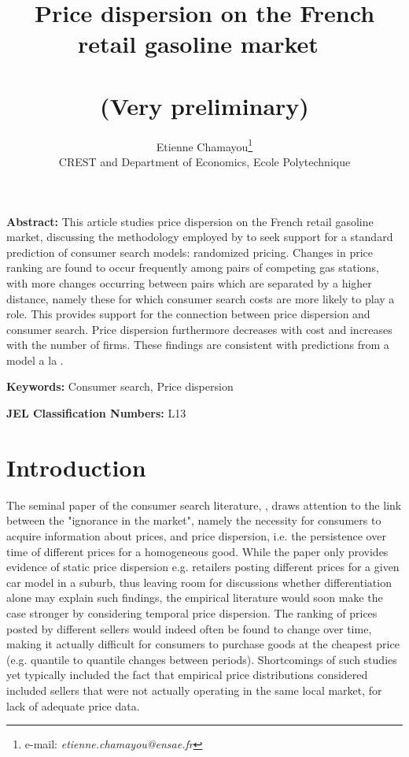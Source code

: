 \documentclass[11pt]{article}
\begin{document}
\title{Price dispersion on the French retail gasoline market\ \\ \ \\(Very preliminary)}
\author{Etienne Chamayou\thanks{e-mail:
\textit{etienne.chamayou@ensae.fr}}\medskip\\{\normalsize CREST and Department of Economics, Ecole Polytechnique }}
\maketitle

\sloppy%

\onehalfspacing

\textbf{Abstract:}
This article studies price dispersion on the French retail gasoline market, discussing the methodology employed by \cite{TAP11} to seek support for a standard prediction of consumer search models: randomized pricing. Changes in price ranking are found to occur frequently among pairs of competing gas stations, with more changes occurring between pairs which are separated by a higher distance, namely these for which consumer search costs are more likely to play a role. This provides support for the connection between price dispersion and consumer search. Price dispersion furthermore decreases with cost and increases with the number of firms. These findings are consistent with predictions from a model a la \cite{VAR80}.

\strut

\textbf{Keywords:} Consumer search, Price dispersion

\strut

\textbf{JEL Classification Numbers:} L13

\pagebreak%

\section{Introduction}

The seminal paper of the consumer search literature, \cite{STI61}, draws attention to the link between the "ignorance in the market", namely the necessity for consumers to acquire information about prices, and price dispersion, i.e. the persistence over time of different prices for a homogeneous good. While the paper only provides evidence of static price dispersion e.g. retailers posting different prices for a given car model in a suburb, thus leaving room for discussions whether differentiation alone may explain such findings, the empirical literature would soon make the case stronger by considering temporal price dispersion. The ranking of prices posted by different sellers would indeed often be found to change over time, making it actually difficult for consumers to purchase goods at the cheapest price (e.g. quantile to quantile changes between periods). Shortcomings of such studies yet typically included the fact that empirical price distributions considered included sellers that were not actually operating in the same local market, for lack of adequate price data.
\end{document}
